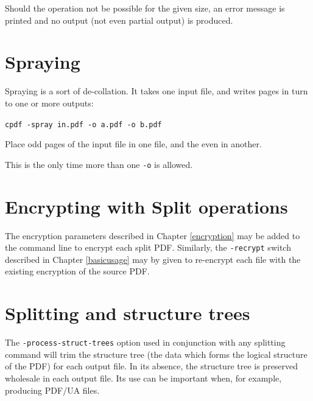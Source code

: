 \documentclass{book}
\begin{document}
\noindent Should the operation not be possible for the given size, an error message is printed and no output (not even partial output) is produced.

\section{Spraying}

Spraying is a sort of de-collation. It takes one input file, and writes pages in turn to one or more outputs:

  \begin{framed}\small
    \noindent\verb!cpdf -spray in.pdf -o a.pdf -o b.pdf!

    \vspace{2.5mm}
    \noindent Place odd pages of the input file in one file, and the even in another.

  \end{framed}

\noindent This is the only time more than one \texttt{-o} is allowed.

\section{Encrypting with Split operations}
The encryption parameters described in Chapter \ref{encryption} may be added to the command line to encrypt each split PDF. Similarly, the \texttt{-recrypt} switch described in Chapter \ref{basicusage} may by given to re-encrypt each file with the existing encryption of the source PDF.

\section{Splitting and structure trees}

The \texttt{-process-struct-trees} option used in conjunction with any splitting command will trim the structure tree (the data which forms the logical structure of the PDF) for each output file. In its absence, the structure tree is preserved wholesale in each output file. Its use can be important when, for example, producing PDF/UA files.

\pagestyle{empty}\thispagestyle{fancy}
\end{document}
